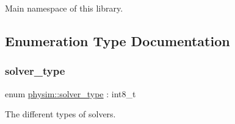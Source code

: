 Main namespace of this library. 

\subsection{Enumeration Type Documentation}
\mbox{\label{namespacephysim_a09adeda29c09e651877e880d31fc9686}} 
\subsubsection{\texorpdfstring{solver\+\_\+type}{solver\_type}}
{\footnotesize\ttfamily enum \hyperlink{namespacephysim_a09adeda29c09e651877e880d31fc9686}{physim\+::solver\+\_\+type} \+: int8\+\_\+t\hspace{0.3cm}{\ttfamily [strong]}}



The different types of solvers. 

